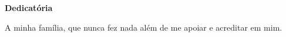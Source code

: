 \def\textoDedicatoria{
  A minha família, que nunca fez nada além de me apoiar e acreditar em mim.
}

\begin{dedicatoria}
  \textbf{Dedicatória}
  \vfill
  \hfill{}
  \parbox{6cm}{
    \begin{flushright}
      \textoDedicatoria\
    \end{flushright}
      }
\end{dedicatoria}
